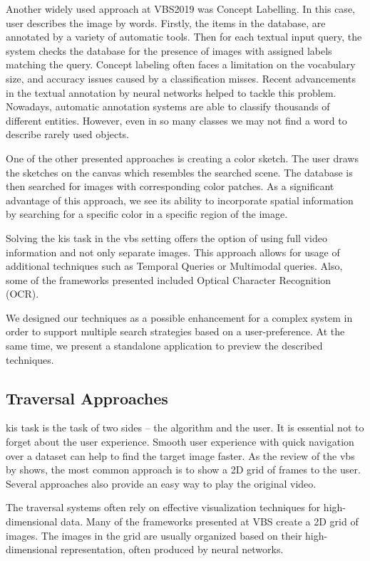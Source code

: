 Another widely used approach at VBS2019 was Concept Labelling. In this case, user describes the image by words. Firstly, the items in the database, are annotated by a variety of automatic tools. Then for each textual input query, the system checks the database for the presence of images with assigned labels matching the query. Concept labeling often faces a limitation on the vocabulary size, and accuracy issues caused by a classification misses. Recent advancements in the textual annotation by neural networks helped to tackle this problem. Nowadays, automatic annotation systems are able to classify thousands of different entities. However, even in so many classes we may not find a word to describe rarely used objects.

One of the other presented approaches is creating a color sketch. The user draws the sketches on the canvas which resembles the searched scene. The database is then searched for images with corresponding color patches. As a significant advantage of this approach, we see its ability to incorporate spatial information by searching for a specific color in a specific region of the image.
 
Solving the \acrshort{kis} task in the \acrshort{vbs} setting offers the option of using full video information and not only separate images. This approach allows for usage of additional techniques such as Temporal Queries or Multimodal queries. Also, some of the frameworks presented included Optical Character Recognition (OCR).

We designed our techniques as a possible enhancement for a complex system in order to support multiple search strategies based on a user-preference. At the same time, we present a standalone application to preview the described techniques.

\subsection{Traversal Approaches}

\acrshort{kis} task is the task of two sides -- the algorithm and the user. It is essential not to forget about the user experience. Smooth user experience with quick navigation over a dataset can help to find the target image faster. As the review of the \acrshort{vbs} by \cite{rossetto2020interactive} shows, the most common approach is to show a 2D grid of frames to the user. Several approaches also provide an easy way to play the original video. 

The traversal systems often rely on effective visualization techniques for high-dimensional data. Many of the frameworks presented at VBS create a 2D grid of images. The images in the grid are usually organized based on their high-dimensional representation, often produced by neural networks. 



